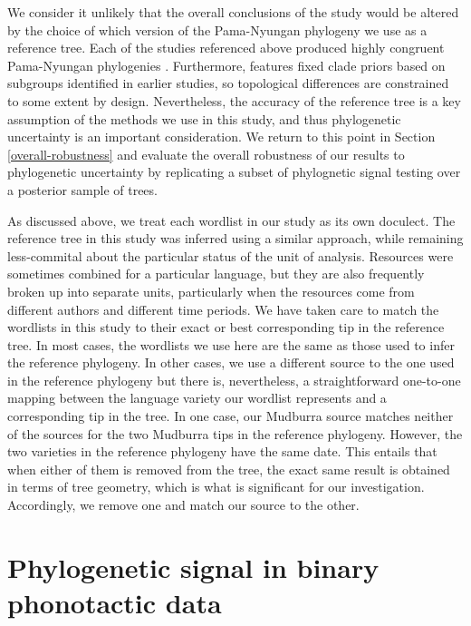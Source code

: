 We consider it unlikely that the overall conclusions of the study would be altered by the choice of which version of the Pama-Nyungan phylogeny we use as a reference tree. Each of the studies referenced above produced highly congruent Pama-Nyungan phylogenies \autocite[see][ for a detailed comparison]{bouckaert_origin_2018}. Furthermore, \textcite{bouckaert_origin_2018} features fixed clade priors based on subgroups identified in earlier studies, so topological differences are constrained to some extent by design. Nevertheless, the accuracy of the reference tree is a key assumption of the methods we use in this study, and thus phylogenetic uncertainty is an important consideration. We return to this point in Section \ref{overall-robustness} and evaluate the overall robustness of our results to phylogenetic uncertainty by replicating a subset of phylognetic signal testing over a posterior sample of trees.

As discussed above, we treat each wordlist in our study as its own doculect. The reference tree in this study was inferred using a similar approach, while remaining less-commital about the particular status of the unit of analysis. Resources were sometimes combined for a particular language, but they are also frequently broken up into separate units, particularly when the resources come from different authors and different time periods. We have taken care to match the wordlists in this study to their exact or best corresponding tip in the reference tree. In most cases, the wordlists we use here are the same as those used to infer the reference phylogeny. In other cases, we use a different source to the one used in the reference phylogeny but there is, nevertheless, a straightforward one-to-one mapping between the language variety our wordlist represents and a corresponding tip in the tree. In one case, our Mudburra source \autocite{nash_mudburra_1988} matches neither of the sources for the two Mudburra tips in the reference phylogeny. However, the two varieties in the reference phylogeny have the same date. This entails that when either of them is removed from the tree, the exact same result is obtained in terms of tree geometry, which is what is significant for our investigation. Accordingly, we remove one and match our source to the other.

\hypertarget{phy-sig-bin}{%
\section{Phylogenetic signal in binary phonotactic data}\label{phy-sig-bin}}

